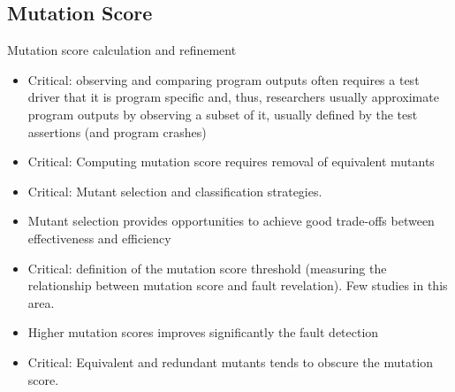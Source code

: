 
\subsection{Mutation Score}\label{sub:mutationscore}

Mutation score calculation and refinement
\begin{itemize}
	\item Critical: observing and comparing program outputs often requires a test driver that it is program specific and, thus, researchers usually approximate program outputs by observing a subset of it, usually defined by the test assertions (and program crashes)
	\item Critical: Computing mutation score requires removal of equivalent mutants
	\item Critical: Mutant selection and classification strategies.
	\item Mutant selection provides opportunities to achieve good trade-offs between effectiveness and efficiency
	\item Critical: definition of the mutation score threshold (measuring the relationship between mutation score and fault revelation). Few studies in this area.
	\item Higher mutation scores improves significantly the fault detection
	\item Critical: Equivalent and redundant mutants tends to obscure the mutation score.
\end{itemize}
